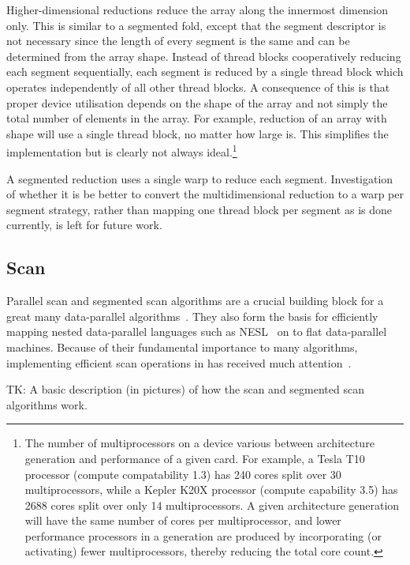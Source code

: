 Higher-dimensional reductions reduce the array along the innermost dimension
only. This is similar to a segmented fold, except that the segment descriptor is
not necessary since the length of every segment is the same and can be
determined from the array shape. Instead of thread blocks cooperatively reducing
each segment sequentially, each segment is reduced by a single thread block
which operates independently of all other thread blocks. A consequence of this
is that proper device utilisation depends on the shape of the array and not
simply the total number of elements in the array. For example, reduction of an
array with shape  will use a single thread block, no matter
how large  is. This simplifies the implementation but is clearly not
always ideal.\footnote{The number of multiprocessors on a device various between
architecture generation and performance of a given card. For example, a Tesla
T10 processor (compute compatability 1.3) has 240 cores split over 30
multiprocessors, while a Kepler K20X processor (compute capability 3.5) has 2688
cores split over only 14 multiprocessors. A given architecture generation will
have the same number of cores per multiprocessor, and lower performance
processors in a generation are produced by incorporating (or activating) fewer
multiprocessors, thereby reducing the total core count.}

A segmented reduction uses a single warp to reduce each segment. Investigation
of whether it is be better to convert the multidimensional reduction to a warp
per segment strategy, rather than mapping one thread block per segment as is
done currently, is left for future work.


\subsection{Scan}

Parallel scan and segmented scan algorithms are a crucial building block for a
great many data-parallel algorithms~\cite{Blelloch:1990ts,Chatterjee:1990vj}.
They also form the basis for efficiently mapping nested data-parallel languages
such as NESL~\cite{Blelloch:1995ut,Blelloch:1996jx} on to flat data-parallel
machines. Because of their fundamental importance to many algorithms,
implementing efficient scan operations in \CUDA has received much
attention~\cite{Sengupta:2007tc,Dotsenko:2008fo,Harris:2012fy}.

TK: A basic description (in pictures) of how the scan and segmented scan
algorithms work.


